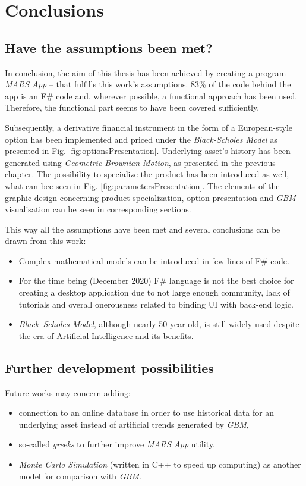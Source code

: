 \chapter{Conclusions}
\section{Have the assumptions been met?}
    In conclusion, the aim of this thesis has been achieved by creating a program -- \textit{MARS App} -- that fulfills this work's assumptions. 83\% of the code behind the app is an F\# code and, wherever possible, a functional approach has been used. Therefore, the functional part seems to have been covered sufficiently.
    
    Subsequently, a derivative financial instrument in the form of a European-style option has been implemented and priced under the \textit{Black-Scholes Model} as presented in Fig. \ref{fig:optionsPresentation}. Underlying asset's history has been generated using \textit{Geometric Brownian Motion}, as presented in the previous chapter. The possibility to specialize the product has been introduced as well, what can bee seen in Fig. \ref{fig:parametersPresentation}. The elements of the graphic design concerning product specialization, option presentation and \textit{GBM} visualisation can be seen in corresponding sections.
    
    This way all the assumptions have been met and several conclusions can be drawn from this work:
    \begin{itemize}
        \item Complex mathematical models can be introduced in few lines of F\# code.
        \item For the time being (December 2020) F\# language is not the best choice for creating a desktop application due to not large enough community, lack of tutorials and overall onerousness related to binding UI with back-end logic.
        \item \textit{Black--Scholes Model}, although nearly 50-year-old, is still widely used despite the era of Artificial Intelligence and its benefits.
    \end{itemize}
    
\section{Further development possibilities}
    Future works may concern adding:
    \begin{itemize}

        \item connection to an online database in order to use historical data for an underlying asset instead of artificial trends generated by \textit{GBM},
        \item so-called \textit{greeks} to further improve \textit{MARS App} utility,
        \item \textit{Monte Carlo Simulation} (written in C++ to speed up computing) as another model for comparison with \textit{GBM}.
    \end{itemize}